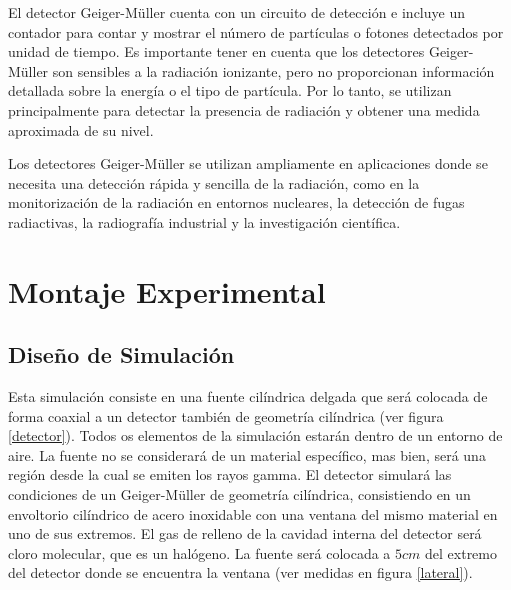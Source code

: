 \documentclass[conference]{IEEEtran}
\begin{document}
El detector Geiger-Müller cuenta con un circuito de detección e incluye un contador para contar y mostrar el número de partículas o fotones detectados por unidad de tiempo. Es importante tener en cuenta que los detectores Geiger-Müller son sensibles a la radiación ionizante, pero no proporcionan información detallada sobre la energía o el tipo de partícula. Por lo tanto, se utilizan principalmente para detectar la presencia de radiación y obtener una medida aproximada de su nivel.

Los detectores Geiger-Müller se utilizan ampliamente en aplicaciones donde se necesita una detección rápida y sencilla de la radiación, como en la monitorización de la radiación en entornos nucleares, la detección de fugas radiactivas, la radiografía industrial y la investigación científica.






\section{Montaje Experimental}
%
\subsection{Diseño de Simulación}
Esta simulación consiste en una fuente cilíndrica delgada que será colocada de forma coaxial a un detector también de geometría cilíndrica (ver figura \ref{detector}). Todos os elementos de la simulación estarán dentro de un entorno de aire. La fuente no se considerará de un material específico, mas bien, será una región desde la cual se emiten los rayos gamma. El detector simulará las condiciones de un Geiger-Müller de geometría cilíndrica, consistiendo en un envoltorio cilíndrico de acero inoxidable con una ventana del mismo material en uno de sus extremos. El gas de relleno de la cavidad interna del detector será cloro molecular, que es un halógeno. La fuente será colocada a $5cm$ del extremo del detector donde se encuentra la ventana (ver medidas en figura \ref{lateral}).
        
\end{document}

